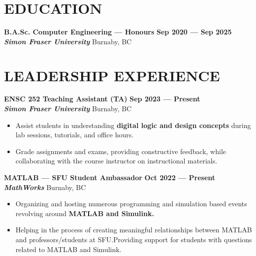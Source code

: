\documentclass[letterpaper,11pt]{article}
\newcommand{\Item} [1] {
    \item\small{{#1 \vspace{-2pt}}}
}
\newcommand{\employer} [5] {
    {\textbf{#3} \hfill \textbf{#4 --- #5}\\ \textbf{\emph{#1}} \hfill #2\\}
}
\newcommand{\school} [5] {
    {\textbf{#3} \hfill \textbf{#4 --- #5}\\ \textbf{\emph{#1}} \hfill #2\\}
}
\newcommand{\workItemListStart} [0] {
    \vspace{-1pt}
    \begin{itemize}[topsep=0pt,itemsep=-2pt]
}
\newcommand{\workItemListEnd} [0] {
    \end{itemize}
    \vspace{1pt}
}
\begin{document}
    \section{EDUCATION}
    \school{Simon Fraser University}{Burnaby, BC}{B.A.Sc. Computer Engineering --- Honours}{Sep 2020}{Sep 2025}

    \section{LEADERSHIP EXPERIENCE}
    \employer{Simon Fraser University}{Burnaby, BC}{ENSC 252 Teaching Assistant (TA)}{Sep 2023}{Present}
    \workItemListStart{}
    \Item{Assist students in understanding \textbf{digital logic and design concepts} during lab sessions, tutorials, and office hours.}
    \Item{Grade assignments and exams, providing constructive feedback, while collaborating with the course instructor on instructional materials.}
    \workItemListEnd{}
    \employer{MathWorks}{Burnaby, BC}{MATLAB --- SFU Student Ambassador}{Oct 2022}{Present}
    \workItemListStart{}
        \Item{Organizing and hosting numerous programming and simulation based events revolving around \textbf{MATLAB and Simulink.}}
        \Item{Helping in the process of creating meaningful relationships between MATLAB and professors/students at SFU.\@ Providing support for students with questions related to MATLAB and Simulink.}
    \workItemListEnd{}
\end{document}
